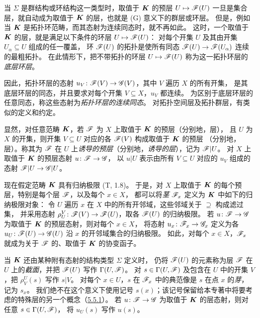 当 $\Sigma$ 是群结构或环结构这一类型时，取值于 $\boldsymbol K$ 的预层 $U\mapsto\mathscr F(U)$
一旦是集合层，就自动成为取值于 $\boldsymbol K$ 的层，也就是 (G) 意义下的群层或环层。
但是，例如当 $\boldsymbol K$ 是拓扑环范畴，而其态射为连续同态时，就不再如此。
这时，一个取值于 $\boldsymbol K$ 的层，就是满足以下条件的环层 $U\mapsto\mathscr F(U)$：
对每个开集 $U$ 及其由开集 $U_\alpha\subseteq U$ 组成的任一覆盖，
环 $\mathscr F(U)$ 的拓扑是使所有同态 $\mathscr F(U)\to\mathscr F(U_\alpha)$ 连续的最粗拓扑。
在此情形下，把不带拓扑的环层 $U\mapsto\mathscr F(U)$ 称为这一拓扑环层的\emph{底层环层}。

因此，拓扑环层的态射 $u_V\colon\mathscr F(V)\to\mathscr G(V)$，其中 $V$ 遍历 $X$ 的所有开集，
是其底层环层的同态，并且要求对每个开集 $V\subseteq X$，$u_V$ 都连续。
为区别于底层环层的任意同态，称这些态射为\emph{拓扑环层的连续同态}。
对拓扑空间层及拓扑群层，有类似的定义和约定。

显然，对任意范畴 $\boldsymbol K$，若 $\mathscr F$ 为 $X$ 上取值于 $\boldsymbol K$ 的预层（分别地，层），
且 $U$ 为 $X$ 的开集，则开集 $V\subseteq U$ 对应的各 $\mathscr F(V)$ 构成取值于 $\boldsymbol K$ 的预层
（分别地，层）。称其为 $\mathscr F$ 在 $U$ 上\emph{诱导的预层}（分别地，\emph{诱导的层}），记为 $\mathscr F|U$。
对 $X$ 上取值于 $\boldsymbol K$ 的预层态射 $u\colon\mathscr F\to\mathscr G$，
以 $u|U$ 表示由所有 $V\subseteq U$ 对应的 $u_V$ 组成的态射 $\mathscr F|U\to\mathscr G|U$。

现在假定范畴 $\boldsymbol K$ 具有归纳极限 (T, 1.8)。
于是，对 $X$ 上取值于 $\boldsymbol K$ 的每个预层，特别是每个层 $\mathscr F$，以及每个 $x\in X$，
都可以将\emph{茎} $\mathscr F_x$ 定义为 $\boldsymbol K$ 中如下的归纳极限对象：
令 $U$ 遍历 $x$ 在 $X$ 中的所有开邻域，这些邻域关于 $\supseteq$ 构成滤过集，
并采用态射 $\rho_U^V\colon\mathscr F(V)\to\mathscr F(U)$，取各 $\mathscr F(U)$ 的归纳极限。
若 $u\colon\mathscr F\to\mathscr G$ 为取值于 $\boldsymbol K$ 的预层态射，则对每个 $x\in X$，
将态射 $u_x\colon\mathscr F_x\to\mathscr G_x$ 定义为各 $u_U\colon\mathscr F(U)\to\mathscr G(U)$
沿 $x$ 的开邻域集合的归纳极限。
如此，对每个 $x\in X$，$\mathscr F_x$ 就成为关于 $\mathscr F$ 的、取值于 $\boldsymbol K$ 的协变函子。

当 $\boldsymbol K$ 还由某种附有态射的结构类型 $\Sigma$ 定义时，
仍将 $\mathscr F(U)$ 的元素称为层 $\mathscr F$ 在 $U$ 上的\emph{截面}，并把 $\mathscr F(U)$ 写作 $\Gamma(U,\mathscr F)$。
对 $s\in\Gamma(U,\mathscr F)$ 及包含在 $U$ 中的开集 $V$，把 $\rho_V^U(s)$ 写作 $s|V$。
对每个 $x\in U$，$s$ 在 $\mathscr F_x$ 中的典范像是 $s$ 在点 $x$ 的\emph{芽}，记为 $s_x$。
我们绝不在这个意义下使用记号 $s(x)$；该记号保留给本专著中将要考虑的特殊层的另一个概念（\hyperlink{para:0:5.5.1}{5.5.1}）。
若 $u\colon\mathscr F\to\mathscr G$ 为取值于 $\boldsymbol K$ 的层态射，则对任意 $s\in\Gamma(U,\mathscr F)$，
将 $u_U(s)$ 写作 $u(s)$。

